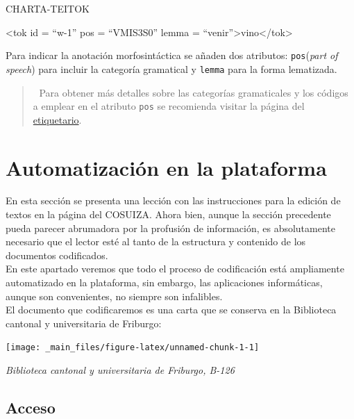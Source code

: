 \documentclass[
]{book}
\begin{document}
CHARTA-TEITOK

{\textless tok} {id} {=} {``w-1''} {pos} {=} {``VMIS3S0''} {lemma} {=} {``venir''}{\textgreater{}}vino{\textless/tok\textgreater{}}

Para indicar la anotación morfosintáctica se añaden dos atributos: \texttt{pos}(\emph{part of speech}) para incluir la categoría gramatical y \texttt{lemma} para la forma lematizada.

\begin{quote}
📝 Para obtener más detalles sobre las categorías gramaticales y los códigos a emplear en el atributo \texttt{pos} se recomienda visitar la página del \href{https://cosuiza.unil.ch/teitok/shared/index.php?action=tagset}{etiquetario}.
\end{quote}

\hypertarget{automatizaciuxf3n-en-la-plataforma}{%
\section*{Automatización en la plataforma}\label{automatizaciuxf3n-en-la-plataforma}}

En esta sección se presenta una lección con las instrucciones para la edición de textos en la página del COSUIZA. Ahora bien, aunque la sección precedente pueda parecer abrumadora por la profusión de información, es absolutamente necesario que el lector esté al tanto de la estructura y contenido de los documentos codificados.\\
En este apartado veremos que todo el proceso de codificación está ampliamente automatizado en la plataforma, sin embargo, las
aplicaciones informáticas, aunque son convenientes, no siempre son infalibles.\\
El documento que codificaremos es una carta que se conserva en la Biblioteca cantonal y universitaria de Friburgo:

\begin{center}\texttt{[image: \_main\_files/figure-latex/unnamed-chunk-1-1]} \end{center}

\emph{Biblioteca cantonal y universitaria de Friburgo, B-126}

\hypertarget{acceso}{%
\subsection*{Acceso}\label{acceso}}
\end{document}
